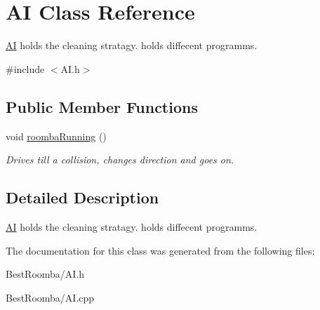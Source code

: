 \hypertarget{class_a_i}{}\section{AI Class Reference}
\label{class_a_i}


\mbox{\hyperlink{class_a_i}{AI}} holds the cleaning stratagy. holds diffecent programms.  




{\ttfamily \#include $<$A\+I.\+h$>$}

\subsection*{Public Member Functions}
\begin{DoxyCompactItemize}
\item 
\mbox{\label{class_a_i_a32d0365a1ff5b9a27fbaa5260d002a45}} 
void \mbox{\hyperlink{class_a_i_a32d0365a1ff5b9a27fbaa5260d002a45}{roomba\+Running}} ()
\begin{DoxyCompactList}\small\item\em Drives till a collision, changes direction and goes on. \end{DoxyCompactList}\end{DoxyCompactItemize}


\subsection{Detailed Description}
\mbox{\hyperlink{class_a_i}{AI}} holds the cleaning stratagy. holds diffecent programms. 

The documentation for this class was generated from the following files\+:\begin{DoxyCompactItemize}
\item 
Best\+Roomba/A\+I.\+h\item 
Best\+Roomba/A\+I.\+cpp\end{DoxyCompactItemize}
